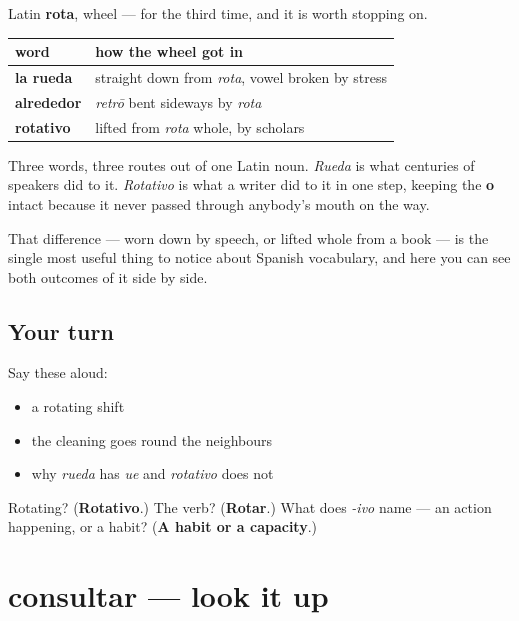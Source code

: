 \begin{cousinweb}
Latin \textbf{rota}, wheel — for the third time, and it is worth stopping on.

\noindent
\begin{tabularx}{\linewidth}{@{}>{\raggedright\arraybackslash}X>{\raggedright\arraybackslash}X@{}}
\toprule
\textbf{word} & \textbf{how the wheel got in} \\
\midrule
\textbf{la rueda} & straight down from \emph{rota}, vowel broken by stress \\
\textbf{alrededor} & \emph{retrō} bent sideways by \emph{rota} \\
\textbf{rotativo} & lifted from \emph{rota} whole, by scholars \\
\bottomrule
\end{tabularx}

Three words, three routes out of one Latin noun. \emph{Rueda} is what centuries of speakers did to it. \emph{Rotativo} is what a writer did to it in one step, keeping the \textbf{o} intact because it never passed through anybody's mouth on the way.

That difference — worn down by speech, or lifted whole from a book — is the single most useful thing to notice about Spanish vocabulary, and here you can see both outcomes of it side by side.
\end{cousinweb}

\subsection*{Your turn}
Say these aloud:

\begin{itemize}
\raggedright
  \item a rotating shift
  \item the cleaning goes round the neighbours
  \item why \emph{rueda} has \emph{ue} and \emph{rotativo} does not
\end{itemize}

\begin{tcolorbox}[breakable,colback=teal!4,colframe=teal!35!black,title={Before you move on}]
Rotating? (\textbf{Rotativo}.) The verb? (\textbf{Rotar}.) What does \emph{-ivo} name — an action happening, or a habit? (\textbf{A habit or a capacity}.)
\end{tcolorbox}
\section[consultar]{consultar — look it up}

